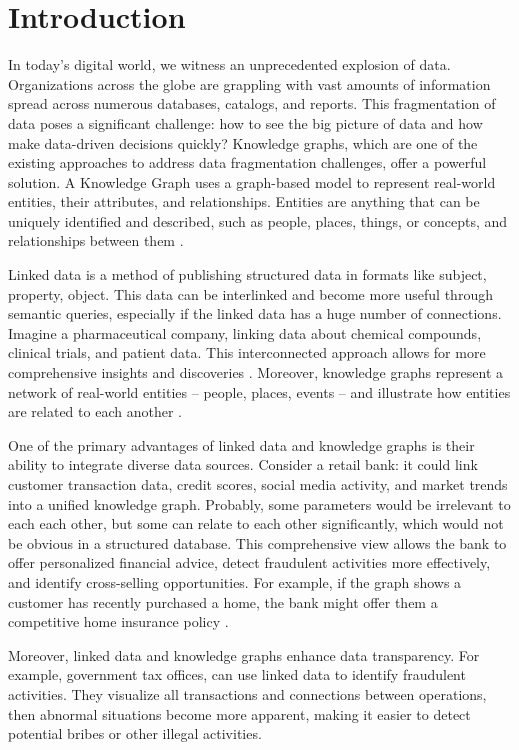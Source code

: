 \clearpage 

\section{Introduction}

In today's digital world, we witness an unprecedented explosion of data. Organizations across the globe are grappling with vast amounts of information spread across numerous databases, catalogs, and reports. This fragmentation of data poses a significant challenge: how to see the big picture of data and how make data-driven decisions quickly? Knowledge graphs, which are one of the existing approaches to address data fragmentation challenges, offer a powerful solution. A Knowledge Graph uses a graph-based model to represent real-world entities, their attributes, and relationships. Entities are anything that can be uniquely identified and described, such as people, places, things, or concepts, and relationships between them \citep{HoganRDF}.

Linked data is a method of publishing structured data in formats like subject, property, object. This data can be interlinked and become more useful through semantic queries, especially if the linked data has a huge number of connections. Imagine a pharmaceutical company, linking data about chemical compounds, clinical trials, and patient data. This interconnected approach allows for more comprehensive insights and discoveries \citep{bizer2011linkeddata}. Moreover, knowledge graphs represent a network of real-world entities – people, places, events – and illustrate how entities are related to each another \citep{ehrlinger2016towards}.

One of the primary advantages of linked data and knowledge graphs is their ability to integrate diverse data sources. Consider a retail bank: it could link customer transaction data, credit scores, social media activity, and market trends into a unified knowledge graph. Probably, some parameters would be irrelevant to each each other, but some can relate to each other significantly, which would not be obvious in a structured database. This comprehensive view allows the bank to offer personalized financial advice, detect fraudulent activities more effectively, and identify cross-selling opportunities. For example, if the graph shows a customer has recently purchased a home, the bank might offer them a competitive home insurance policy \citep{singhal2012introducing}.

Moreover, linked data and knowledge graphs enhance data transparency. For example, government tax offices, can use linked data to identify fraudulent activities. They visualize all transactions and connections between operations, then abnormal situations become more apparent, making it easier to detect potential bribes or other illegal activities.

